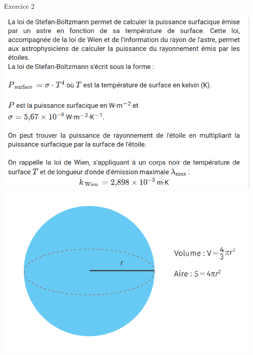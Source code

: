\documentclass[10pt]{article}
\begin{document}

\begin{center}
	Exercice 2 \vspace{10pt}
\end{center}

\includegraphics[scale=0.4]{ex_stefan_boltzmann/enonce.png}
\includegraphics[scale=0.36]{ex_stefan_boltzmann/volume.png}

\vspace{10pt}
\end{document}
